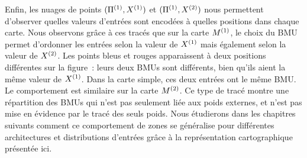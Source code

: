 \documentclass[../main]{subfiles}
\begin{document}
Enfin, les nuages de points $(\Pi^{({1})},X^{({1})})$ et $(\Pi^{({1})},X^{({2})})$ nous permettent d'observer quelles valeurs d'entrées sont encodées à quelles positions dans chaque carte.
Nous observons grâce à ces tracés que sur la carte $M^{({1})}$, le choix du BMU permet d'ordonner les entrées selon la valeur de $X^{({1})}$ mais également selon la valeur de $X^{({2})}$. 
Les points bleus et rouges apparaissent à deux positions différentes sur la figure~: leurs deux BMUs sont différents, bien qu'ils aient la même valeur de $X^{({1})}$. Dans la carte simple, ces deux entrées ont le même BMU.
Le comportement est similaire sur la carte $M^{({2})}$. Ce type de tracé montre une répartition des BMUs qui n'est pas seulement liée aux poids externes, et n'est pas mise en évidence par le tracé des seuls poids.
Nous étudierons dans les chapitres suivants comment ce comportement de zones se généralise pour différentes architectures et distributions d'entrées grâce à la représentation cartographique présentée ici.
\end{document}
